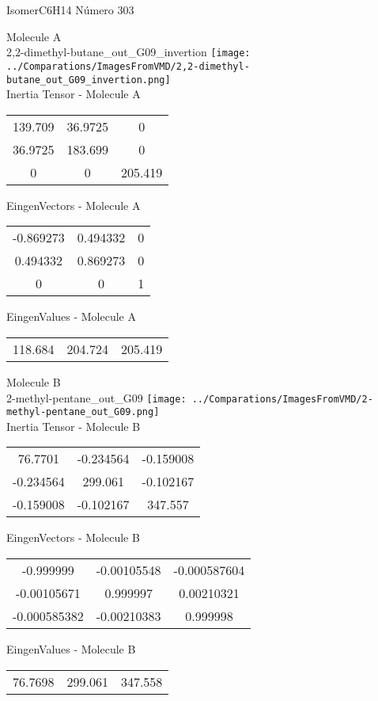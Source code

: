 \vtab[-2cm]
\begin{center}
{\large IsomerC6H14 \tab Número 303}
\end{center}
\begin{multicols}{2}
\begin{center}

Molecule A \\ 
2,2-dimethyl-butane\_out\_G09\_invertion
\texttt{[image: ../Comparations/ImagesFromVMD/2,2-dimethyl-butane\_out\_G09\_invertion.png]}
\\
Inertia Tensor - Molecule A \\
\vtab

\begin{tabular}{|c c c|}
139.709	 & 	36.9725	 & 	0	 \\
36.9725	 & 	183.699	 & 	0	 \\
0	 & 	0	 & 	205.419
\end{tabular}

\vtab
 EingenVectors - Molecule A     \\
\vtab
\begin{tabular}{|c c c|}
-0.869273	 & 	0.494332	 & 	0	 \\
0.494332	 & 	0.869273	 & 	0	 \\
0	 & 	0	 & 	1
\end{tabular}

\vtab
 EingenValues - Molecule A     \\
\vtab
\begin{tabular}{|c c c|}
118.684	 & 	204.724	 & 	205.419	 \\
\end{tabular}
\columnbreak

Molecule B \\ 
2-methyl-pentane\_out\_G09
\texttt{[image: ../Comparations/ImagesFromVMD/2-methyl-pentane\_out\_G09.png]}
\\
Inertia Tensor - Molecule B \\
\vtab

\begin{tabular}{|c c c|}
76.7701	 & 	-0.234564	 & 	-0.159008	 \\
-0.234564	 & 	299.061	 & 	-0.102167	 \\
-0.159008	 & 	-0.102167	 & 	347.557
\end{tabular}

\vtab
 EingenVectors - Molecule B     \\
\vtab
\begin{tabular}{|c c c|}
-0.999999	 & 	-0.00105548	 & 	-0.000587604	 \\
-0.00105671	 & 	0.999997	 & 	0.00210321	 \\
-0.000585382	 & 	-0.00210383	 & 	0.999998
\end{tabular}

\vtab
 EingenValues - Molecule B     \\
\vtab
\begin{tabular}{|c c c|}
76.7698	 & 	299.061	 & 	347.558	 \\
\end{tabular}

\end{center}
\end{multicols}
